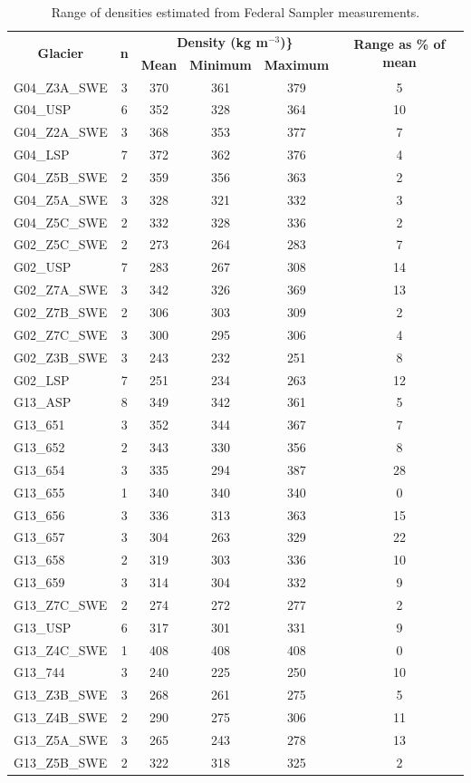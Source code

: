 \documentclass[12pt]{article}
\begin{document}
\begin{table}[]
\centering
\caption{Range of densities estimated from Federal Sampler measurements. }
\label{my-label}
\begin{tabular}{lccccc}
\multicolumn{1}{c}{\multirow{2}{*}{\textbf{Glacier}}} & \multirow{2}{*}{\textbf{n}} & \multicolumn{3}{c}{\textbf{Density (kg m$^{-3}$)\}}} & \multirow{2}{*}{\textbf{Range as \% of mean}} \\
\multicolumn{1}{c}{} &  & \textbf{Mean} & \textbf{Minimum} & \textbf{Maximum} &  \\ \hline
G04\_Z3A\_SWE & 3 & 370 & 361 & 379 & 5 \\
G04\_USP & 6 & 352 & 328 & 364 & 10 \\
G04\_Z2A\_SWE & 3 & 368 & 353 & 377 & 7 \\
G04\_LSP & 7 & 372 & 362 & 376 & 4 \\
G04\_Z5B\_SWE & 2 & 359 & 356 & 363 & 2 \\
G04\_Z5A\_SWE & 3 & 328 & 321 & 332 & 3 \\
G04\_Z5C\_SWE & 2 & 332 & 328 & 336 & 2 \\
G02\_Z5C\_SWE & 2 & 273 & 264 & 283 & 7 \\
G02\_USP & 7 & 283 & 267 & 308 & 14 \\
G02\_Z7A\_SWE & 3 & 342 & 326 & 369 & 13 \\
G02\_Z7B\_SWE & 2 & 306 & 303 & 309 & 2 \\
G02\_Z7C\_SWE & 3 & 300 & 295 & 306 & 4 \\
G02\_Z3B\_SWE & 3 & 243 & 232 & 251 & 8 \\
G02\_LSP & 7 & 251 & 234 & 263 & 12 \\
G13\_ASP & 8 & 349 & 342 & 361 & 5 \\
G13\_651 & 3 & 352 & 344 & 367 & 7 \\
G13\_652 & 2 & 343 & 330 & 356 & 8 \\
G13\_654 & 3 & 335 & 294 & 387 & 28 \\
G13\_655 & 1 & 340 & 340 & 340 & 0 \\
G13\_656 & 3 & 336 & 313 & 363 & 15 \\
G13\_657 & 3 & 304 & 263 & 329 & 22 \\
G13\_658 & 2 & 319 & 303 & 336 & 10 \\
G13\_659 & 3 & 314 & 304 & 332 & 9 \\
G13\_Z7C\_SWE & 2 & 274 & 272 & 277 & 2 \\
G13\_USP & 6 & 317 & 301 & 331 & 9 \\
G13\_Z4C\_SWE & 1 & 408 & 408 & 408 & 0 \\
G13\_744 & 3 & 240 & 225 & 250 & 10 \\
G13\_Z3B\_SWE & 3 & 268 & 261 & 275 & 5 \\
G13\_Z4B\_SWE & 2 & 290 & 275 & 306 & 11 \\
G13\_Z5A\_SWE & 3 & 265 & 243 & 278 & 13 \\
G13\_Z5B\_SWE & 2 & 322 & 318 & 325 & 2
\end{tabular}
\end{table}
\end{document}

